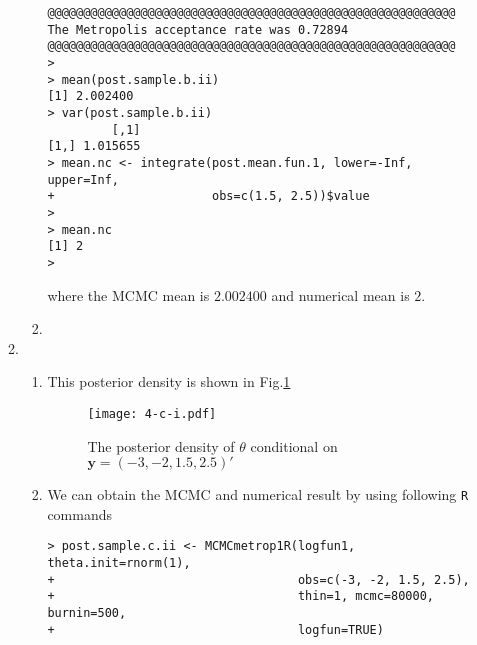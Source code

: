 \documentclass[twoside,11pt]{amsart}
\begin{document}
\begin{enumerate}
\begin{enumerate}
\begin{enumerate}
\begin{small}
\begin{verbatim}
@@@@@@@@@@@@@@@@@@@@@@@@@@@@@@@@@@@@@@@@@@@@@@@@@@@@@@@@@
The Metropolis acceptance rate was 0.72894
@@@@@@@@@@@@@@@@@@@@@@@@@@@@@@@@@@@@@@@@@@@@@@@@@@@@@@@@@
> 
> mean(post.sample.b.ii)
[1] 2.002400
> var(post.sample.b.ii)
         [,1]
[1,] 1.015655
> mean.nc <- integrate(post.mean.fun.1, lower=-Inf, upper=Inf, 
+                      obs=c(1.5, 2.5))$value
> 
> mean.nc
[1] 2
>         
      \end{verbatim}
      \end{small}
      where the MCMC mean is $2.002400$ and numerical mean is $2$.
    \item
    \end{enumerate}
  \item
    \begin{enumerate}
    \item This posterior density is shown in Fig.\ref{fig:4-c-i}
      \begin{figure}[h]
        \texttt{[image: 4-c-i.pdf]}
        \caption{The posterior density of $\theta$ conditional on $\bm
          y = (-3, -2, 1.5, 2.5)'$}\label{fig:4-c-i}
      \end{figure}
    \item
      We can obtain the MCMC and numerical result by using following
      {\tt R} commands
      \begin{small}
      \begin{verbatim}
> post.sample.c.ii <- MCMCmetrop1R(logfun1, theta.init=rnorm(1), 
+                                  obs=c(-3, -2, 1.5, 2.5),
+                                  thin=1, mcmc=80000, burnin=500, 
+                                  logfun=TRUE) 


\end{verbatim}
\end{small}
\end{enumerate}
\end{enumerate}
\end{enumerate}
\end{document}
